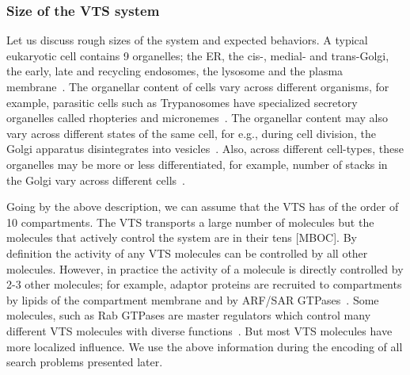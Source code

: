 \subsubsection{Size of the VTS system}
Let us discuss rough sizes of the system and expected behaviors.
A typical eukaryotic cell contains 9 organelles; the ER, the cis-, medial- and trans-Golgi, the early, late and recycling endosomes, the lysosome and the plasma membrane~\cite{lodish2008molecular}. 
%
The organellar content of cells vary across different organisms, for example, parasitic cells such as Trypanosomes have specialized secretory organelles called rhopteries and micronemes~\cite{gubbels2012evolution}. 
%
The organellar content may also vary across different states of the same cell, for e.g., during cell division, the Golgi apparatus disintegrates into vesicles~\cite{tang2013cell}. 
%
Also, across different cell-types, these organelles may be more or less differentiated, for example, number of stacks in the Golgi vary across different cells~\cite{polishchuk2004structural}. 
%

Going by the above description, we can assume that the VTS has of the order of 10 compartments. 
%
The VTS transports a large number of molecules but the molecules that actively control the system are in their tens [MBOC]. 
%
By definition the activity of any VTS molecules can be controlled by all other molecules.
%
However, in practice the activity of a molecule is directly controlled by 2-3 other molecules; for example, adaptor proteins are recruited to compartments by lipids of the compartment membrane and by ARF/SAR GTPases~\cite{kahn2009toward}. 
%
Some molecules, such as Rab GTPases are master regulators which control many different VTS molecules with diverse functions~\cite{zerial2001rab}. 
%
But most VTS molecules have more localized influence.
%
We use the above information during the encoding of all search problems presented later.

